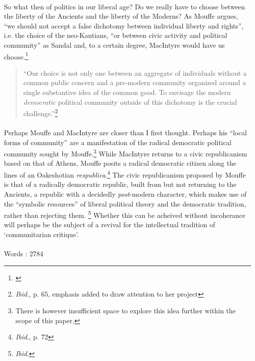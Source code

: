 \documentclass[12pt,a4paper,titlepage]{article}
\begin{document}
\paragraph{}So what then of politics in our liberal age? Do we really have to choose between the liberty of the Ancients and the liberty of the Moderns? As Mouffe argues, ``we should not accept a false dichotomy between individual liberty and rights'', i.e. the choice of the neo-Kantians, ``or between civic activity and political community'' as Sandal and, to a certain degree, MacIntyre would have us choose.\footnote{\cite[p. 65]{mouffe:2005rp}} 

\begin{quote}
``Our choice is not only one between an aggregate of individuals without a common public concern and a pre-modern community organized around a single substantive idea of the common good. To envisage the modern \textit{democratic} political community outside of this dichotomy is the crucial challenge.''\footnote{\textit{Ibid}., p. 65, emphasis added to draw attention to her project}
\end{quote}

\paragraph{}Perhaps Mouffe and MacIntyre are closer than I first thought. Perhaps his ``local forms of community'' are a manifestation of the radical democratic political community sought by Mouffe.\footnote{There is however insufficient space to explore this idea further within the scope of this paper.} While MacIntyre returns to a civic republicanism based on that of Athens, Mouffe posits a radical democratic citizen along the lines of an Oakeshotian \textit{respublica}.\footnote{\textit{Ibid}., p. 72} The civic republicanism proposed by Mouffe is that of a radically democratic republic, built from but not returning to the Ancients, a republic with a decidedly \textit{post}-modern character, which makes use of the ``symbolic resources'' of liberal political theory and the democratic tradition, rather than rejecting them. \footnote{\textit{Ibid}.} Whether this can be acheived without incoherance will perhaps be the subject of a revival for the intellectual tradition of `communitarian critique'.

\newpage
\singlespacing

\medskip
\paragraph{}Words : 2784
\end{document}
